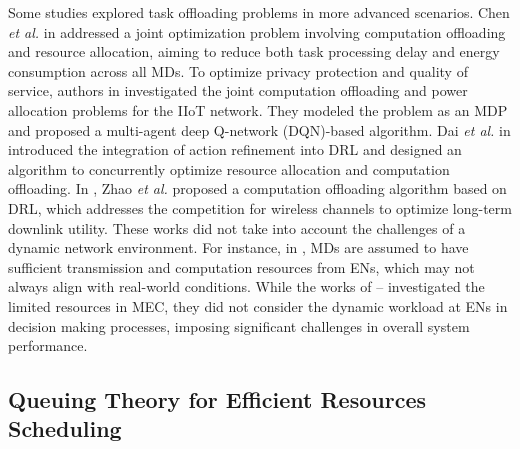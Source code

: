 \documentclass[10pt, journal,letterpaper]{IEEEtran}
\begin{document}
	 Some studies explored task offloading problems in more advanced scenarios. Chen \textit{et al.} in \cite{chen2021drl} addressed a joint optimization problem involving computation offloading and resource allocation, aiming to reduce both task processing delay and energy consumption across all MDs.
	 To optimize privacy protection and quality of service, authors in \cite{wu2024privacy} investigated the joint computation offloading and power allocation problems for the IIoT network. They modeled the problem as an MDP and proposed a multi-agent deep Q-network (DQN)-based algorithm.
	 Dai \textit{et al.} in \cite{dai2020edge} introduced the integration of action refinement into DRL and designed an algorithm to concurrently optimize resource allocation and computation offloading.
	 In \cite{zhao2019deep}, Zhao \textit{et al.} proposed a computation offloading algorithm based on DRL, which addresses the competition for wireless channels to optimize long-term downlink utility.
	 These works did not take into account the challenges of a dynamic network environment. For instance, in \cite{chen2021drl}, MDs are assumed to have sufficient transmission and computation resources from ENs, which may not always align with real-world conditions. While the works of \cite{wu2024privacy}--\cite{zhao2019deep} investigated the limited resources in MEC, they did not consider the dynamic workload at ENs in decision making processes, imposing significant challenges in overall system performance. 

 



	 
	 


\subsection{Queuing Theory for Efficient Resources Scheduling}


\end{document}
